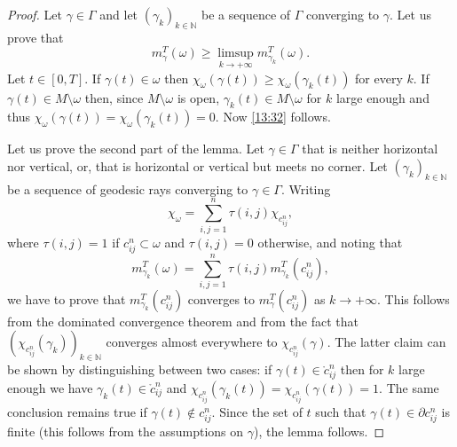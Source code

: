 \documentclass[JEP,XML,SOM,Unicode, NoEqCountersInSection,NoFloatCountersInSection,published]{cedram}
\def\N{\mathbb{N}}
\theoremstyle{definition}
\begin{document}
\begin{proof}
{Let $\gamma\in\Gamma$ and let $(\gamma_k)_{k\in\N}$ be a sequence of $\Gamma$ converging to $\gamma$. Let us prove that
\begin{equation}\label{13:32}
m_\gamma^T(\omega) \geq \limsup_{k\rightarrow+\infty} m_{\gamma_k}^T(\omega).
\end{equation}
Let $t\in[0,T]$. If $\gamma(t)\in\omega$ then $\chi_\omega(\gamma(t)) \geq \chi_\omega(\gamma_k(t))$ for every $k$. If $\gamma(t)\in M\setminus\omega$ then, since $M\setminus\omega$ is open, $\gamma_k(t)\in M\setminus\omega$ for $k$ large enough and thus $\chi_\omega(\gamma(t)) = \chi_\omega(\gamma_k(t)) = 0$. Now \eqref{13:32} follows.
}

Let us prove the second part of the lemma.
Let $\gamma\in\Gamma$ that is neither horizontal nor vertical, or, that is horizontal or vertical but meets no corner. Let $(\gamma_k)_{k\in \N}$ be a sequence of geodesic rays converging to $\gamma\in \Gamma$.
Writing
\[
\chi_{\omega}=\sum_{i,j=1}^n\tau(i,j)\chi_{c_{ij}^n},
\]
where $\tau(i,j)=1$ if $c_{ij}^n\subset \omega$ and $\tau(i,j)=0$ otherwise, and noting that
\[
m^T_{\gamma_k}(\omega)=\sum_{i,j=1}^n\tau(i,j)m^T_{\gamma_k}(c_{ij}^n),
\]
we have to prove that $m^T_{\gamma_k}(c_{ij}^n)$ converges to $m^T_{\gamma}(c_{ij}^n)$ as $k\rightarrow+\infty$. This follows from the dominated convergence theorem and from the fact that $(\chi_{c_{ij}^n}(\gamma_k) )_{k\in \N}$ converges almost everywhere to $\chi_{c_{ij}^n}(\gamma) $. The latter claim can be shown by distinguishing between two cases: if $\gamma(t)\in \mathring{c}_{ij}^n$ then for $k$ large enough we have $\gamma_k(t)\in \mathring{c}_{ij}^n$ and $\chi_{c_{ij}^n}(\gamma_k(t))=\chi_{c_{ij}^n}(\gamma(t))=1$. The same conclusion remains true if $\gamma(t)\notin c_{ij}^n$. Since the set of $t$ such that $\gamma(t)\in \partial c_{ij}^n$ is finite {(this follows from the assumptions on $\gamma$)},
the lemma follows.
\end{proof}
\end{document}
